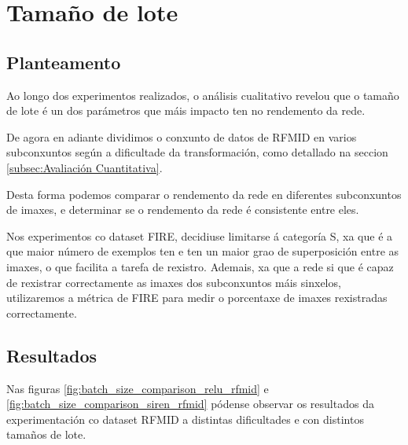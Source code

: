 \section{Tamaño de lote}
\label{sec:Tamaño de lote}

\subsection{Planteamento}
\label{subsec:Planteamento-batchsize}

Ao longo dos experimentos realizados, o análisis cualitativo revelou que o tamaño de lote é un dos parámetros que máis impacto ten no rendemento da rede.

De agora en adiante dividimos o conxunto de datos de RFMID en varios subconxuntos según a dificultade da transformación, como detallado na seccion \ref{subsec:Avaliación Cuantitativa}.

Desta forma podemos comparar o rendemento da rede en diferentes subconxuntos de imaxes, e determinar se o rendemento da rede é consistente entre eles.

Nos experimentos co dataset FIRE, decidiuse limitarse á categoría S, xa que é a que maior número de exemplos ten e ten un maior grao de superposición entre as imaxes, o que facilita a tarefa de rexistro.
Ademais, xa que a rede si que é capaz de rexistrar correctamente as imaxes dos subconxuntos máis sinxelos, utilizaremos a métrica de FIRE para medir o porcentaxe de imaxes rexistradas correctamente.

\subsection{Resultados}
\label{subsec:Resultados-batchsize}

Nas figuras \ref{fig:batch_size_comparison_relu_rfmid} e \ref{fig:batch_size_comparison_siren_rfmid} pódense observar os resultados da experimentación co dataset RFMID a distintas dificultades e con distintos tamaños de lote.

